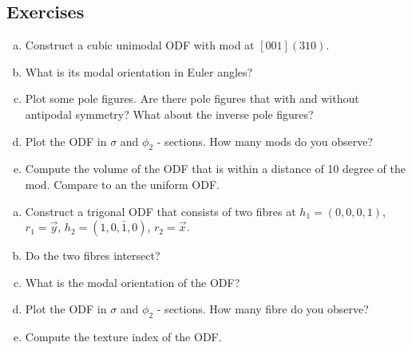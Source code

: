 \subsection*{Exercises}

\begin{frame}

  \begin{Exercise}
    \begin{enumerate}[a)]
      \item Construct a cubic unimodal ODF with mod at $[0 0 1](3 1 0)$.
      \item What is its modal orientation in Euler angles?
      \item Plot some pole figures. Are there pole figures that with and without
        antipodal symmetry? What about the inverse pole figures?
      \item Plot the ODF in $\sigma$ and $\phi_{2}$ - sections. How many mods
        do you observe?
      \item Compute the volume of the ODF that is within a distance of 10
        degree of the mod. Compare to an the uniform ODF.
    \end{enumerate}
  \end{Exercise}

  \begin{Exercise}
    \begin{enumerate}[a)]
    \item Construct a trigonal ODF that consists of two fibres at
      $h_1 = (0,0,0,1)$, $r_{1} = \vec y$, $h_2 = (1,0,\bar 1,0)$, $r_{2} = \vec x$.
    \item Do the two fibres intersect?
    \item What is the modal orientation of the ODF?
    \item Plot the ODF in $\sigma$ and $\phi_{2}$ - sections. How many
      fibre do you observe?
    \item Compute the texture index of the ODF.
    \end{enumerate}
  \end{Exercise}

\end{frame}


